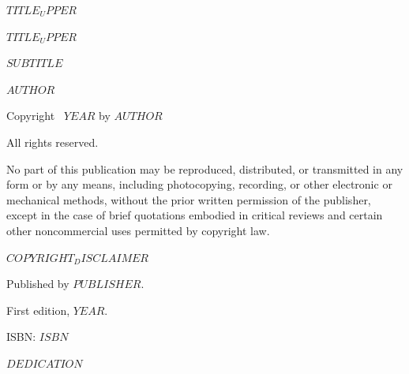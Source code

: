 \newcommand{\forceleftpage}{%
  \clearpage
  \ifodd\value{page}
    \thispagestyle{empty}\hbox{}\newpage
  \fi
}

\thispagestyle{empty}
\begin{center}
\vspace*{6cm}
{\LARGE \textbf{$TITLE_UPPER$}}
\end{center}
\cleardoublepage

\thispagestyle{empty}
\begin{center}
\vspace*{4cm}
{\LARGE \textbf{$TITLE_UPPER$}}

\vspace{0.5cm}

{\large $SUBTITLE$}

\vspace{3cm}

{\normalsize $AUTHOR$}
\end{center}
\forceleftpage

\thispagestyle{empty}
\vspace*{5cm}

\noindent Copyright \textcopyright\ $YEAR$ by $AUTHOR$

\noindent All rights reserved.

\vspace{0.5cm}

\noindent No part of this publication may be reproduced, distributed, or transmitted in any form or by any means, including photocopying, recording, or other electronic or mechanical methods, without the prior written permission of the publisher, except in the case of brief quotations embodied in critical reviews and certain other noncommercial uses permitted by copyright law.

\vspace{0.5cm}

\noindent $COPYRIGHT_DISCLAIMER$

\vspace{0.5cm}

\noindent Published by $PUBLISHER$.

\vspace{0.5cm}

\noindent First edition, $YEAR$.

\vspace{0.5cm}

\noindent ISBN: $ISBN$

\cleardoublepage

\thispagestyle{empty}
\vspace*{6cm}
\begin{center}
\textit{$DEDICATION$}
\end{center}
\cleardoublepage
